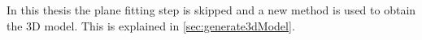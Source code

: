 In this thesis the plane fitting step is skipped and a new method is
used to obtain the 3D model. This is explained in \ref{sec:generate3dModel}.

% 




%  
%  
%  
%  
%  
%  
